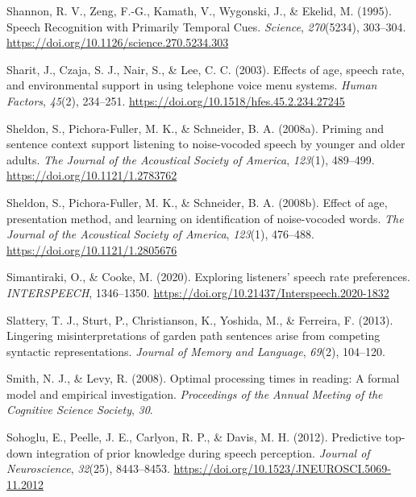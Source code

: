 \documentclass[a4paper, nobind]{templates/ociamthesis}
\newlength{\cslhangindent}
\newenvironment{CSLReferences}[2] %
 {%
  \setlength{\parindent}{0pt}
  \ifodd #1
  \let\oldpar\par
  \def\par{\hangindent=\cslhangindent\oldpar}
  \fi
  \setlength{\parskip}{1mm}
  \setlength{\baselineskip}{6mm}
 }%
 {}
\begin{document}
\begin{CSLReferences}{1}{0}
\leavevmode{}%
Shannon, R. V., Zeng, F.-G., Kamath, V., Wygonski, J., \& Ekelid, M. (1995). Speech Recognition with Primarily Temporal Cues. \emph{Science}, \emph{270}(5234), 303--304. \url{https://doi.org/10.1126/science.270.5234.303}

\leavevmode{}%
Sharit, J., Czaja, S. J., Nair, S., \& Lee, C. C. (2003). {Effects of age, speech rate, and environmental support in using telephone voice menu systems}. \emph{Human Factors}, \emph{45}(2), 234--251. \url{https://doi.org/10.1518/hfes.45.2.234.27245}

\leavevmode{}%
Sheldon, S., Pichora-Fuller, M. K., \& Schneider, B. A. (2008a). Priming and sentence context support listening to noise-vocoded speech by younger and older adults. \emph{The Journal of the Acoustical Society of America}, \emph{123}(1), 489--499. \url{https://doi.org/10.1121/1.2783762}

\leavevmode{}%
Sheldon, S., Pichora-Fuller, M. K., \& Schneider, B. A. (2008b). Effect of age, presentation method, and learning on identification of noise-vocoded words. \emph{The Journal of the Acoustical Society of America}, \emph{123}(1), 476--488. \url{https://doi.org/10.1121/1.2805676}

\leavevmode{}%
Simantiraki, O., \& Cooke, M. (2020). {Exploring listeners' speech rate preferences}. \emph{INTERSPEECH}, 1346--1350. \url{https://doi.org/10.21437/Interspeech.2020-1832}

\leavevmode{}%
Slattery, T. J., Sturt, P., Christianson, K., Yoshida, M., \& Ferreira, F. (2013). Lingering misinterpretations of garden path sentences arise from competing syntactic representations. \emph{Journal of Memory and Language}, \emph{69}(2), 104--120.

\leavevmode{}%
Smith, N. J., \& Levy, R. (2008). Optimal processing times in reading: A formal model and empirical investigation. \emph{Proceedings of the Annual Meeting of the Cognitive Science Society}, \emph{30}.

\leavevmode{}%
Sohoglu, E., Peelle, J. E., Carlyon, R. P., \& Davis, M. H. (2012). {Predictive top-down integration of prior knowledge during speech perception}. \emph{Journal of Neuroscience}, \emph{32}(25), 8443--8453. \url{https://doi.org/10.1523/JNEUROSCI.5069-11.2012}


\end{CSLReferences}
\end{document}
